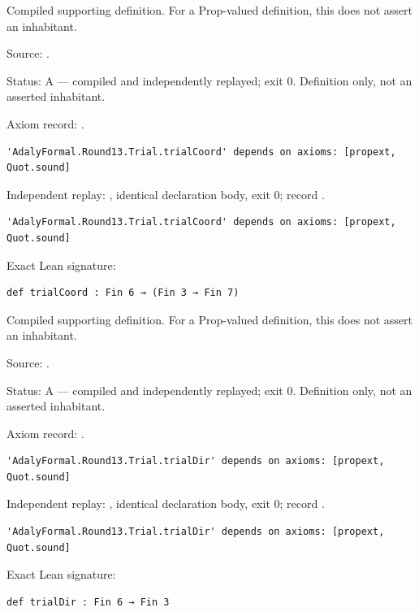\begin{definition}[bp-349]
\label{bp-349}
\uses{}
\leanok
Compiled supporting definition. For a Prop-valued definition, this does not assert an inhabitant.

\par Source: \texttt{}.
\par Status: A — compiled and independently replayed; exit 0. Definition only, not an asserted inhabitant.
\par Axiom record: \texttt{}.
\begin{verbatim}
'AdalyFormal.Round13.Trial.trialCoord' depends on axioms: [propext, Quot.sound]
\end{verbatim}
\par Independent replay: \texttt{}, identical declaration body, exit 0; record \texttt{}.
\begin{verbatim}
'AdalyFormal.Round13.Trial.trialCoord' depends on axioms: [propext, Quot.sound]
\end{verbatim}
\par Exact Lean signature:
\begin{verbatim}
def trialCoord : Fin 6 → (Fin 3 → Fin 7)
\end{verbatim}
\end{definition}

\begin{definition}[bp-350]
\label{bp-350}
\uses{}
\leanok
Compiled supporting definition. For a Prop-valued definition, this does not assert an inhabitant.

\par Source: \texttt{}.
\par Status: A — compiled and independently replayed; exit 0. Definition only, not an asserted inhabitant.
\par Axiom record: \texttt{}.
\begin{verbatim}
'AdalyFormal.Round13.Trial.trialDir' depends on axioms: [propext, Quot.sound]
\end{verbatim}
\par Independent replay: \texttt{}, identical declaration body, exit 0; record \texttt{}.
\begin{verbatim}
'AdalyFormal.Round13.Trial.trialDir' depends on axioms: [propext, Quot.sound]
\end{verbatim}
\par Exact Lean signature:
\begin{verbatim}
def trialDir : Fin 6 → Fin 3
\end{verbatim}
\end{definition}

